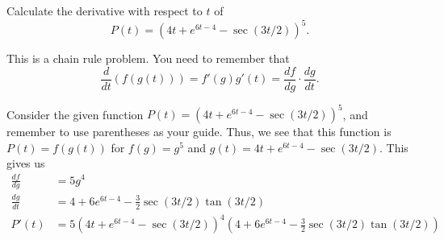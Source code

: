\documentclass{ximera}
\author{Emma Smith Zbarsky}
\begin{document}
\begin{exercise}

Calculate the derivative with respect to $t$ of
\[P(t) = \left(4t+e^{6t-4}-\sec(3t/2)\right)^5.\]


\begin{hint}
This is a chain rule problem. You need to remember that
\[\frac{d}{dt}\left(f(g(t))\right) = f'(g)g'(t) = \frac{df}{dg}\cdot\frac{dg}{dt}.\]
\end{hint}


\begin{hint}
Consider the given function
$P(t)=\left(4t+e^{6t-4}-\sec(3t/2)\right)^5$, and remember to use
parentheses as your guide. Thus, we see that this function is
$P(t) = f(g(t))$ for $f(g) = g^5$ and $g(t) = 4t+e^{6t-4}-\sec(3t/2)$.
This gives us \begin{align*}
\frac{df}{dg} &= 5g^4 \\
\frac{dg}{dt} &= 4+6e^{6t-4}-\frac{3}{2}\sec(3t/2)\tan(3t/2) \\
P'(t) &= 5\left(4t+e^{6t-4}-\sec(3t/2)\right)^4\left(4+6e^{6t-4}-\frac{3}{2}\sec(3t/2)\tan(3t/2)\right)
\end{align*}
\end{hint}


\begin{multipleChoice}
\end{multipleChoice}

\end{exercise}
\end{document}
